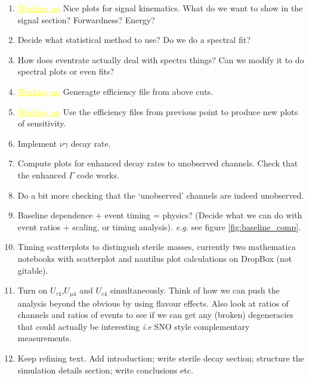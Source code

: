 \documentclass[11pt, a4paper]{article}
\newcommand{\newtext}[2]{\textcolor{#1}{\ul{#2}}}
\begin{document}
\begin{enumerate}

	\item \newtext{MARK}{Working on} Nice plots for signal kinematics. What do we want to show in the signal
section? Forwardness? Energy? 

\item Decide what statistical method to use? Do we do a spectral fit?

\item How does eventrate actually deal with spectra things? Can we modify it to 
do spectral plots or even fits?


\item \newtext{MARK}{Working on} Generagte efficiency file from above cuts.

\item \newtext{MARK}{Working on} Use the efficiency files from previous point to produce new plots of
sensitivity.

\item Implement $\nu\gamma$ decay rate. 

\item Compute plots for enhanced decay rates to unobserved channels. Check that
the enhanced $\Gamma$ code works.

\item Do a bit more checking that the `unobserved' channels are indeed unobserved.

\item Baseline dependence + event timing = physics? (Decide what we can do with
event ratios + scaling, or timing analysis).  \emph{e.g.} see figure
\ref{fig:baseline_comp}.

\item Timing scatterplots to distingush sterile masses, currently two mathematica notebooks with scatterplot and nautilus plot calculations on DropBox (not gitable).

\item Turn on $U_{\tau 4}$,$U_{\mu 4}$ and $U_{e4}$ simultaneously. Think of
how we can push the analysis beyond the obvious by using flavour effects. Also
look at ratios of channels and ratios of events to see if we can get any
(broken) degeneracies that could actually be interesting \emph{i.e} SNO style
complementary measurements.

\item Keep refining text. Add introduction; write sterile decay section; structure 
the simulation details section; write conclusions etc.


\end{enumerate}
\end{document}
